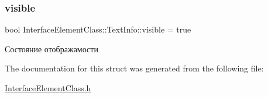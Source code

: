 \subsubsection{\texorpdfstring{visible}{visible}}
{\footnotesize\ttfamily bool Interface\+Element\+Class\+::\+Text\+Info\+::visible = true}



Состояние отображамости 



The documentation for this struct was generated from the following file\+:\begin{DoxyCompactItemize}
\item 
\hyperlink{_interface_element_class_8h}{Interface\+Element\+Class.\+h}\end{DoxyCompactItemize}
